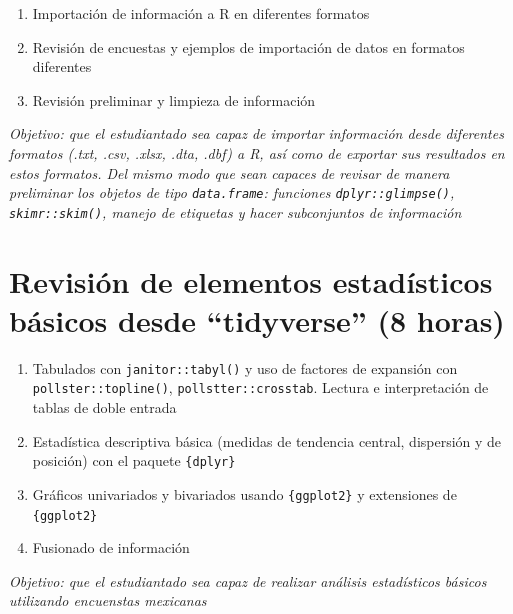 \documentclass[
  letterpaper,
  DIV=11,
  numbers=noendperiod]{scrreprt}
\begin{document}
\begin{enumerate}
\def\labelenumi{\alph{enumi}.}
\item
  Importación de información a R en diferentes formatos
\item
  Revisión de encuestas y ejemplos de importación de datos en formatos
  diferentes
\item
  Revisión preliminar y limpieza de información
\end{enumerate}

\emph{Objetivo: que el estudiantado sea capaz de importar información
desde diferentes formatos (.txt, .csv, .xlsx, .dta, .dbf) a R, así como
de exportar sus resultados en estos formatos. Del mismo modo que sean
capaces de revisar de manera preliminar los objetos de tipo
\texttt{data.frame}: funciones \texttt{dplyr::glimpse()},
\texttt{skimr::skim()}, manejo de etiquetas y hacer subconjuntos de
información}

\hypertarget{revisiuxf3n-de-elementos-estaduxedsticos-buxe1sicos-desde-tidyverse-8-horas}{%
\section*{Revisión de elementos estadísticos básicos desde ``tidyverse''
(8
horas)}\label{revisiuxf3n-de-elementos-estaduxedsticos-buxe1sicos-desde-tidyverse-8-horas}}


\begin{enumerate}
\def\labelenumi{\alph{enumi}.}
\item
  Tabulados con \texttt{janitor::tabyl()} y uso de factores de expansión
  con \texttt{pollster::topline()}, \texttt{pollstter::crosstab}.
  Lectura e interpretación de tablas de doble entrada
\item
  Estadística descriptiva básica (medidas de tendencia central,
  dispersión y de posición) con el paquete \texttt{\{dplyr\}}
\item
  Gráficos univariados y bivariados usando \texttt{\{ggplot2\}} y
  extensiones de \texttt{\{ggplot2\}}
\item
  Fusionado de información
\end{enumerate}

\emph{Objetivo: que el estudiantado sea capaz de realizar análisis
estadísticos básicos utilizando encuenstas mexicanas}
\end{document}

